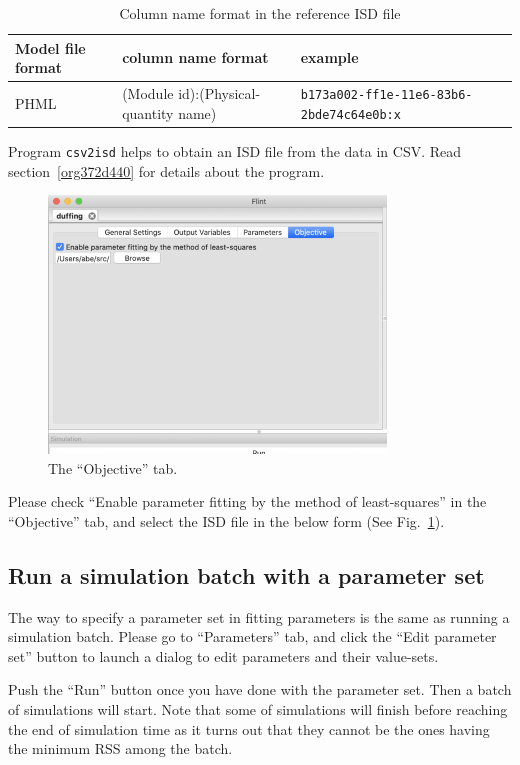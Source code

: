 \documentclass[a4paper,10pt]{report}
\begin{document}
\begin{table}[htbp]
\caption{\label{tab:orga1586d0}Column name format in the reference ISD file}
\centering
\begin{tabular}{lll}
Model file format & column name format & example\\
\hline
PHML & (Module id):(Physical-quantity name) & \texttt{b173a002-ff1e-11e6-83b6-2bde74c64e0b:x}\\
\end{tabular}
\end{table}

Program \texttt{csv2isd} helps to obtain an ISD file from the data in CSV.
Read section~\ref{org372d440} for details about the program.

\begin{figure}[htbp]
\centering
\includegraphics[width=0.8\textwidth]{image/parameter-fitting-objective.png}
\caption{\label{fig:org0e99ab8}The ``Objective'' tab.}
\end{figure}

Please check ``Enable parameter fitting by the method of least-squares'' in the
``Objective'' tab, and select the ISD file in the below form (See
Fig.~\ref{fig:org0e99ab8}).

\subsection{Run a simulation batch with a parameter set}
\label{sec:org1bb3f65}
The way to specify a parameter set in fitting parameters is the same as running
a simulation batch. Please go to ``Parameters'' tab, and click the ``Edit parameter
set'' button to launch a dialog to edit parameters and their value-sets.

Push the ``Run'' button once you have done with the parameter set. Then a batch
of simulations will start. Note that some of simulations will finish before
reaching the end of simulation time as it turns out that they cannot be the ones
having the minimum RSS among the batch.
\end{document}
